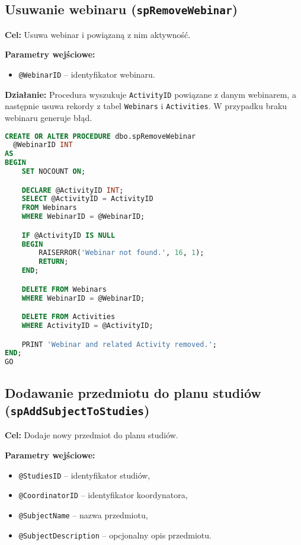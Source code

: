 \documentclass[12pt]{article}
\begin{document}
\newpage
\subsection{Usuwanie webinaru (\texttt{spRemoveWebinar})}
\textbf{Cel:} Usuwa webinar i powiązaną z nim aktywność.

\textbf{Parametry wejściowe:}
\begin{itemize}
  \item \verb|@WebinarID| – identyfikator webinaru.
\end{itemize}

\textbf{Działanie:} Procedura wyszukuje \verb|ActivityID| powiązane z danym webinarem, a następnie usuwa rekordy z tabel \verb|Webinars| i \verb|Activities|. W przypadku braku webinaru generuje błąd.

\begin{lstlisting}[language=SQL]
CREATE OR ALTER PROCEDURE dbo.spRemoveWebinar
  @WebinarID INT
AS
BEGIN
    SET NOCOUNT ON;

    DECLARE @ActivityID INT;
    SELECT @ActivityID = ActivityID
    FROM Webinars
    WHERE WebinarID = @WebinarID;

    IF @ActivityID IS NULL
    BEGIN
        RAISERROR('Webinar not found.', 16, 1);
        RETURN;
    END;

    DELETE FROM Webinars
    WHERE WebinarID = @WebinarID;

    DELETE FROM Activities
    WHERE ActivityID = @ActivityID;

    PRINT 'Webinar and related Activity removed.';
END;
GO
\end{lstlisting}

\newpage
\subsection{Dodawanie przedmiotu do planu studiów (\texttt{spAddSubjectToStudies})}
\textbf{Cel:} Dodaje nowy przedmiot do planu studiów.

\textbf{Parametry wejściowe:}
\begin{itemize}
  \item \verb|@StudiesID| – identyfikator studiów,
  \item \verb|@CoordinatorID| – identyfikator koordynatora,
  \item \verb|@SubjectName| – nazwa przedmiotu,
  \item \verb|@SubjectDescription| – opcjonalny opis przedmiotu.
\end{itemize}
\end{document}

